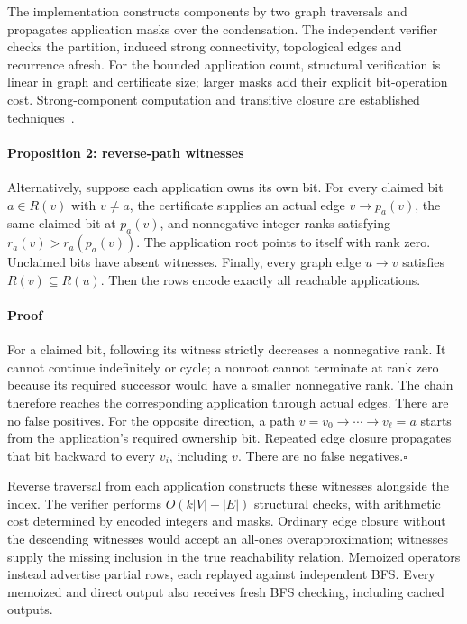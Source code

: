 \documentclass[11pt,letterpaper]{article}
\begin{document}
The implementation constructs components by two graph traversals and propagates application masks over the condensation. The independent verifier checks the partition, induced strong connectivity, topological edges and recurrence afresh. For the bounded application count, structural verification is linear in graph and certificate size; larger masks add their explicit bit-operation cost. Strong-component computation and transitive closure are established techniques~\cite{tarjan1972dfs,warshall1962boolean}.

\paragraph{Proposition 2: reverse-path witnesses}
Alternatively, suppose each application owns its own bit. For every claimed bit $a\in R(v)$ with $v\ne a$, the certificate supplies an actual edge $v\to p_a(v)$, the same claimed bit at $p_a(v)$, and nonnegative integer ranks satisfying $r_a(v)>r_a(p_a(v))$. The application root points to itself with rank zero. Unclaimed bits have absent witnesses. Finally, every graph edge $u\to v$ satisfies $R(v)\subseteq R(u)$. Then the rows encode exactly all reachable applications.

\paragraph{Proof}
For a claimed bit, following its witness strictly decreases a nonnegative rank. It cannot continue indefinitely or cycle; a nonroot cannot terminate at rank zero because its required successor would have a smaller nonnegative rank. The chain therefore reaches the corresponding application through actual edges. There are no false positives. For the opposite direction, a path $v=v_0\to\cdots\to v_\ell=a$ starts from the application's required ownership bit. Repeated edge closure propagates that bit backward to every $v_i$, including $v$. There are no false negatives.\hfill$\square$

Reverse traversal from each application constructs these witnesses alongside the index. The verifier performs $O(k|V|+|E|)$ structural checks, with arithmetic cost determined by encoded integers and masks. Ordinary edge closure without the descending witnesses would accept an all-ones overapproximation; witnesses supply the missing inclusion in the true reachability relation. Memoized operators instead advertise partial rows, each replayed against independent BFS. Every memoized and direct output also receives fresh BFS checking, including cached outputs.
\end{document}
